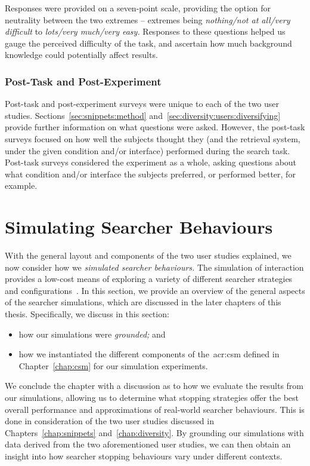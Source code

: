 Responses were provided on a seven-point scale, providing the option for neutrality between the two extremes -- extremes being \emph{nothing/not at all/very difficult} to \emph{lots/very much/very easy.} Responses to these questions helped us gauge the perceived difficulty of the task, and ascertain how much background knowledge could potentially affect results.

\subsubsection{Post-Task and Post-Experiment}
Post-task and post-experiment surveys were unique to each of the two user studies. Sections~\ref{sec:snippets:method} and~\ref{sec:diversity:users:diversifying} provide further information on what questions were asked. However, the post-task surveys focused on how well the subjects thought they (and the retrieval system, under the given condition and/or interface) performed during the search task. Post-task surveys considered the experiment as a whole, asking questions about what condition and/or interface the subjects preferred, or performed better, for example.

\section{Simulating Searcher Behaviours}\label{sec:method:simulation}
With the general layout and components of the two user studies explained, we now consider how we \emph{simulated searcher behaviours.} The simulation of interaction provides a low-cost means of exploring a variety of different searcher strategies and configurations~\citep{azzopardi2010workshop}. In this section, we provide an overview of the general aspects of the  searcher simulations, which are discussed in the later chapters of this thesis. Specifically, we discuss in this section:

\begin{itemize}
    \item{how our simulations were \emph{grounded;} and}
    \item{how we instantiated the different components of the~\gls{acr:csm} defined in Chapter~\ref{chap:csm} for our simulation experiments.}
\end{itemize}

We conclude the chapter with a discussion as to how we evaluate the results from our simulations, allowing us to determine what stopping strategies offer the best overall performance and approximations of real-world searcher behaviours. This is done in consideration of the two user studies discussed in Chapters~\ref{chap:snippets} and~\ref{chap:diversity}. By grounding our simulations with data derived from the two aforementioned user studies, we can then obtain an insight into how searcher stopping behaviours vary under different contexts.

